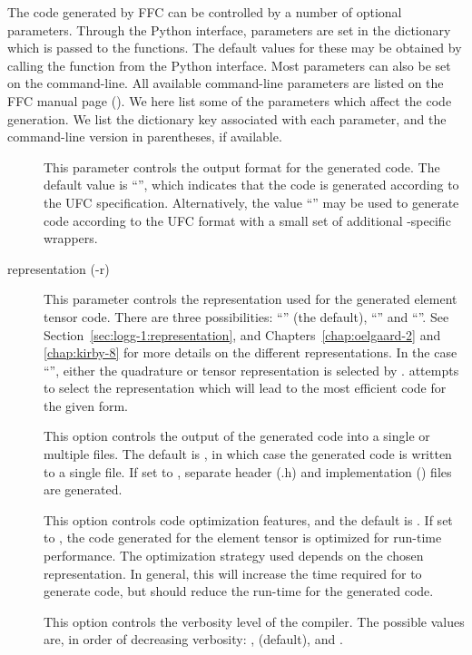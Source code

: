 The code generated by FFC can be controlled by a number of optional
parameters. Through the Python interface, parameters are set in the
dictionary  which is passed to the 
functions.  The default values for these may be obtained by calling
the function  from the Python interface. Most
parameters can also be set on the command-line.  All available
command-line parameters are listed on the FFC manual page (). We here list some of the parameters which affect the code
generation. We list the dictionary key associated with each parameter,
and the command-line version in parentheses, if available.
%
\begin{description}
  \item[]
    This parameter controls the output format for the generated
    code. The default value is ``'', which indicates that the
    code is generated according to the UFC
    specification. Alternatively, the value ``'' may be
    used to generate code according to the UFC format with a small set
    of additional \dolfin{}-specific wrappers.  \item[representation
      (-r)] This parameter controls the representation used for the
    generated element tensor code. There are three possibilities:
    ``'' (the default), ``'' and
    ``''. See Section~\ref{sec:logg-1:representation}, and
    Chapters~\ref{chap:oelgaard-2} and \ref{chap:kirby-8} for more
    details on the different representations. In the case
    ``'', either the quadrature or tensor representation is
    selected by \ffc{}. \ffc{} attempts to select the representation
    which will lead to the most efficient code for the given form.
  \item[] This option controls the output of the
    generated code into a single or multiple files. The default is
    , in which case the generated code is written to a single
    file. If set to , separate header (.h) and implementation
    () files are generated.
  \item[] This option controls code optimization features,
    and the default is . If set to , the code
    generated for the element tensor is optimized for run-time performance.
    The optimization strategy used depends on
    the chosen representation. In general, this will increase the
    time required for \ffc{} to generate code, but should reduce the run-time
    for the generated code.
  \item[] This option controls the verbosity level of the
    compiler. The possible values are, in order of decreasing
    verbosity: ,  (default),  and .
\end{description}

